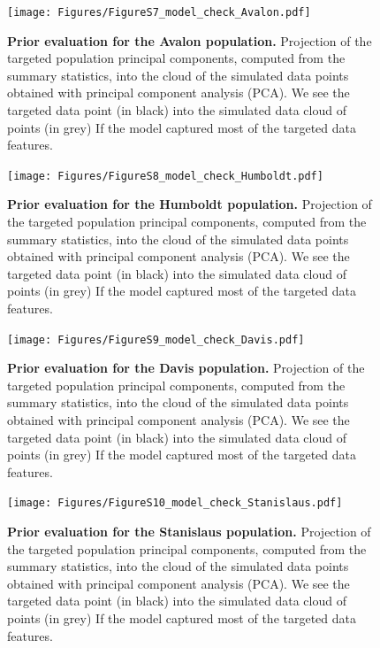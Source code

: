 \documentclass[a4paper, 12pt]{article}
\begin{document}
\begin{figure}[ht]
  \centering
  \texttt{[image: Figures/FigureS7\_model\_check\_Avalon.pdf]}
  \small\caption{\textbf{Prior evaluation for the Avalon population.} Projection of the targeted population principal components, computed from the summary statistics, into the cloud of the simulated data points obtained with principal component analysis (PCA). We see the targeted data point (in black) into the simulated data cloud of points (in grey) If the model captured most of the targeted data features.}
  \label{fig:supple_model_check_avalon}
\end{figure}

\begin{figure}[ht]
  \centering
  \texttt{[image: Figures/FigureS8\_model\_check\_Humboldt.pdf]}
  \small\caption{\textbf{Prior evaluation for the Humboldt population.} Projection of the targeted population principal components, computed from the summary statistics, into the cloud of the simulated data points obtained with principal component analysis (PCA). We see the targeted data point (in black) into the simulated data cloud of points (in grey) If the model captured most of the targeted data features.}
  \label{fig:supple_model_check_humboldt}
\end{figure}

\begin{figure}[ht]
  \centering
  \texttt{[image: Figures/FigureS9\_model\_check\_Davis.pdf]}
  \small\caption{\textbf{Prior evaluation for the Davis population.} Projection of the targeted population principal components, computed from the summary statistics, into the cloud of the simulated data points obtained with principal component analysis (PCA). We see the targeted data point (in black) into the simulated data cloud of points (in grey) If the model captured most of the targeted data features.}
  \label{fig:supple_model_check_davis}
\end{figure}

\begin{figure}[ht]
  \centering
  \texttt{[image: Figures/FigureS10\_model\_check\_Stanislaus.pdf]}
  \small\caption{\textbf{Prior evaluation for the Stanislaus population.} Projection of the targeted population principal components, computed from the summary statistics, into the cloud of the simulated data points obtained with principal component analysis (PCA). We see the targeted data point (in black) into the simulated data cloud of points (in grey) If the model captured most of the targeted data features.}
  \label{fig:supple_model_check_stanislaus}
\end{figure}
\end{document}
